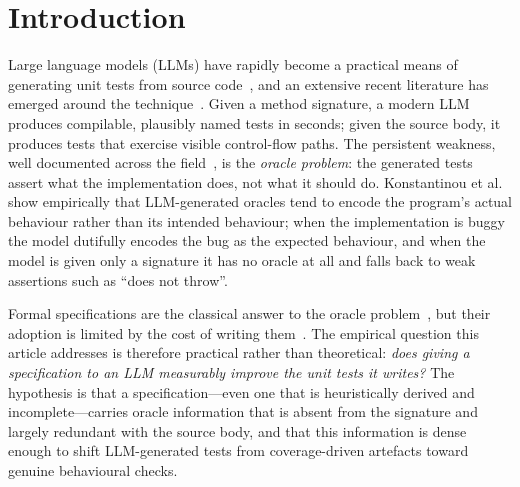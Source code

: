 \section{Introduction}
\label{sec:introduction}

Large language models (LLMs) have rapidly become a practical means of generating unit tests from source code~\cite{schafer2023adaptive, chen2022codet, yuan2024chattester, lemieux2023codamosa, chen2021codex}, and an extensive recent literature has emerged around the technique~\cite{zhang2025llmunitsurvey}. Given a method signature, a modern LLM produces compilable, plausibly named tests in seconds; given the source body, it produces tests that exercise visible control-flow paths. The persistent weakness, well documented across the field~\cite{schafer2023adaptive, jiang2024survey, konstantinou2024oracles}, is the \emph{oracle problem}: the generated tests assert what the implementation does, not what it should do. Konstantinou et al.~\cite{konstantinou2024oracles} show empirically that LLM-generated oracles tend to encode the program's actual behaviour rather than its intended behaviour; when the implementation is buggy the model dutifully encodes the bug as the expected behaviour, and when the model is given only a signature it has no oracle at all and falls back to weak assertions such as ``does not throw''.

Formal specifications are the classical answer to the oracle problem~\cite{meyer1992design, jml, leavens2006design}, but their adoption is limited by the cost of writing them~\cite{matichuk_cost_2015, hall1990seven, zimmermann2019lightweight}. The empirical question this article addresses is therefore practical rather than theoretical: \emph{does giving a specification to an LLM measurably improve the unit tests it writes?} The hypothesis is that a specification---even one that is heuristically derived and incomplete---carries oracle information that is absent from the signature and largely redundant with the source body, and that this information is dense enough to shift LLM-generated tests from coverage-driven artefacts toward genuine behavioural checks.

